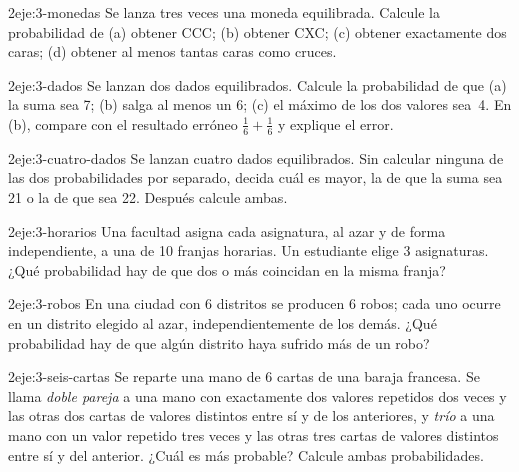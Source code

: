\begin{ejercicio}{2}{eje:3-monedas}
Se lanza tres veces una moneda equilibrada. Calcule la probabilidad de (a) obtener CCC; (b) obtener CXC; (c) obtener exactamente dos caras; (d) obtener al menos tantas caras como cruces.
\end{ejercicio}

\begin{ejercicio}{2}{eje:3-dados}
Se lanzan dos dados equilibrados. Calcule la probabilidad de que (a) la suma sea 7; (b) salga al menos un 6; (c) el máximo de los dos valores sea~4. En (b), compare con el resultado erróneo $\frac16+\frac16$ y explique el error.
\end{ejercicio}

\begin{ejercicio}{2}{eje:3-cuatro-dados}
Se lanzan cuatro dados equilibrados. Sin calcular ninguna de las dos probabilidades por separado, decida cuál es mayor, la de que la suma sea 21 o la de que sea 22. Después calcule ambas.
\end{ejercicio}

\begin{ejercicio}{2}{eje:3-horarios}
Una facultad asigna cada asignatura, al azar y de forma independiente, a una de 10 franjas horarias. Un estudiante elige 3 asignaturas. ¿Qué probabilidad hay de que dos o más coincidan en la misma franja?
\end{ejercicio}

\begin{ejercicio}{2}{eje:3-robos}
En una ciudad con 6 distritos se producen 6 robos; cada uno ocurre en un distrito elegido al azar, independientemente de los demás. ¿Qué probabilidad hay de que algún distrito haya sufrido más de un robo?
\end{ejercicio}

\begin{ejercicio}{2}{eje:3-seis-cartas}
Se reparte una mano de 6 cartas de una baraja francesa. Se llama \emph{doble pareja} a una mano con exactamente dos valores repetidos dos veces y las otras dos cartas de valores distintos entre sí y de los anteriores, y \emph{trío} a una mano con un valor repetido tres veces y las otras tres cartas de valores distintos entre sí y del anterior. ¿Cuál es más probable? Calcule ambas probabilidades.
\end{ejercicio}

